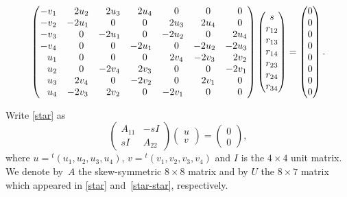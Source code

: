\begin{gather}
\begin{pmatrix}
-v_1 & \hphantom{-}2u_2 & \hphantom{-}2u_3 & \hphantom{-}2u_4 & \hphantom{-}0 & \hphantom{-}0 & \hphantom{-}0
\\
-v_2 & -2u_1 & \hphantom{-}0 & \hphantom{-}0 & \hphantom{-}2u_3 & \hphantom{-}2u_4 & \hphantom{-}0
\\
-v_3 & \hphantom{-}0 & -2u_1 & \hphantom{-}0 & -2u_2 & \hphantom{-}0 & \hphantom{-}2u_4
\\
-v_4 & \hphantom{-}0 & \hphantom{-}0 & -2u_1 & \hphantom{-}0 & -2u_2 & -2u_3
\\
\hphantom{-}u_1 & \hphantom{-}0 & \hphantom{-}0 & \hphantom{-}0 & \hphantom{-}2v_4 & -2v_3 & \hphantom{-}2v_2
\\
\hphantom{-}u_2 & \hphantom{-}0 & -2v_4 & \hphantom{-}2v_3 & \hphantom{-}0 & \hphantom{-}0 & -2v_1
\\
\hphantom{-}u_3 & \hphantom{-}2v_4 & \hphantom{-}0 & -2v_2 & \hphantom{-}0 & \hphantom{-}2v_1 & \hphantom{-}0
\\
\hphantom{-}u_4 & -2v_3 & \hphantom{-}2v_2 & \hphantom{-}0 & -2v_1 & \hphantom{-}0 & \hphantom{-}0
\end{pmatrix}
\begin{pmatrix}
s
\\
r_{12}
\\
r_{13}
\\
r_{14}
\\
r_{23}
\\
r_{24}
\\
r_{34}
\end{pmatrix} =
\begin{pmatrix}
0
\\
0
\\
0
\\
0
\\
0
\\
0
\\
0
\\
0
\end{pmatrix}.\label{star-star}
\end{gather}

Write \eqref{star} as
\[
\begin{pmatrix}
A_{11} & -sI
\\
sI & A_{22}
\end{pmatrix}
\begin{pmatrix}
u
\\
v
\end{pmatrix} =
\begin{pmatrix}
0
\\
0
\end{pmatrix},
\]
where $u = {}^t(u_1, u_2, u_3, u_4)$, $v = {}^t(v_1, v_2, v_3, v_4)$ and $I$ is the $4\times 4$ unit matrix.
We denote by~$A$ the skew-symmetric $8\times 8$ matrix
and by $U$ the $8\times 7$ matrix which appeared in \eqref{star} and~\eqref{star-star}, respectively.

